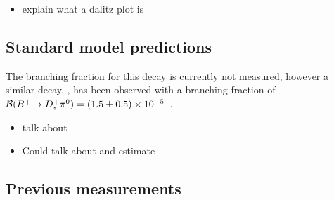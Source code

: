 {\color{Red}
\begin{itemize}
\item explain what a dalitz plot is
\end{itemize}
}

\subsection{Standard model predictions}
{\color{Blue}
The branching fraction for this decay is currently not measured, however a similar decay, \decay{\Bp}{\Dsp \piz}, has been observed with a branching fraction of $\mathcal{B}({{{B}^+}}\!\rightarrow {\ensuremath{{D}^+_{s}}} {\ensuremath{{\pi}^0}}) = (1.5 \pm 0.5) \times 10^{-5}$~\cite{Aubert:2006xy}.
}


{\color{Red}
\begin{itemize}
\item talk about \decay{\Bp}{\Dsp\piz}
\item Could talk about \decay{\Bp}{\Dp\Kp\pim} and estimate   
\end{itemize}}

\subsection{Previous measurements}



